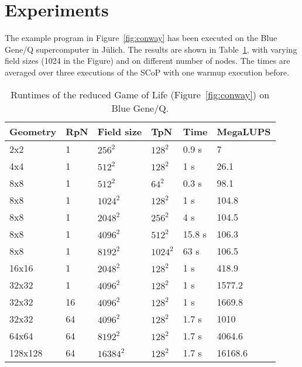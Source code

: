\documentclass{sigplanconf}
\begin{document}
\section{Experiments}\label{sct:experiments}

The example program in Figure~\ref{fig:conway} has been executed on the Blue Gene/Q supercomputer in Jülich. The results are shown in Table~\ref{tab:results}, with varying field sizes (1024 in the Figure) and on different number of nodes. The times are averaged over three executions of the SCoP with one warmup execution before.

\begin{table}
\begin{tabular}{llllll}
Geometry & RpN\footnotemark[3] & Field size & TpN\footnotemark[4] & Time & MegaLUPS\footnotemark[5] \\
\hline
2x2           & 1              & $256^2$  & $128^2$ &  0.9 s  & 7 \\ 4x4           & 1              & $512^2$  & $128^2$ &  1 s   & 26.1 \\ 8x8           & 1              & $512^2$  & $64^2$ &  0.3 s  & 98.1 \\ 8x8           & 1              & $1024^2$  &  $128^2$ &  1   s & 104.8 \\ 8x8           & 1              & $2048^2$  &  $256^2$ &  4   s & 104.5  \\ 8x8           & 1              & $4096^2$  & $512^2$ &  15.8 s  & 106.3 \\ 8x8           & 1              & $8192^2$  & $1024^2$ &  63 s  & 106.5 \\ 16x16         & 1              & $2048^2$  & $128^2$ &  1 s  & 418.9 \\ 32x32         & 1              & $4096^2$  & $128^2$ &  1 s  & 1577.2 \\ 32x32         & 16              & $4096^2$  & $128^2$ &  1 s  & 1669.8 \\ 32x32         & 64              & $4096^2$  & $128^2$ &  1.7 s  & 1010 \\ 64x64         & 64              & $8192^2$  & $128^2$ &  1.7 s  & 4064.6 \\ 128x128       & 64              & $16384^2$  & $128^2$ &  1.7 s  & 16168.6 \\ \end{tabular}
\centering
\caption{Runtimes of the reduced Game of Life (Figure~\ref{fig:conway}) on Blue Gene/Q.}\label{tab:results}
\end{table}
\end{document}
